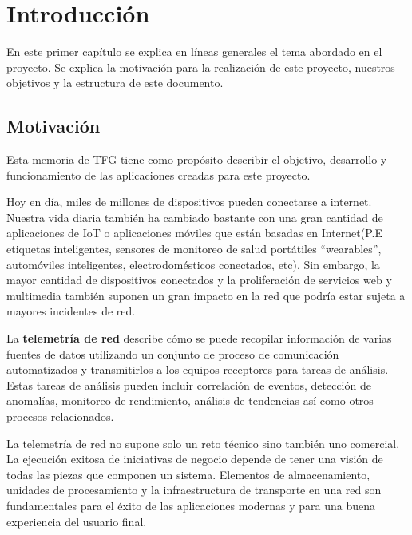 \chapter{Introducción}

    En este primer capítulo se explica en líneas generales el tema abordado en el proyecto. Se explica la motivación para la realización de este proyecto, nuestros objetivos y la estructura de este documento.

\section{Motivación}
    Esta memoria de \gls{TFG} tiene como propósito describir el objetivo, desarrollo y funcionamiento de las aplicaciones creadas para este proyecto.
    
    Hoy en día, miles de millones de dispositivos pueden conectarse a internet. Nuestra vida diaria también ha cambiado bastante con una gran cantidad de aplicaciones de IoT o aplicaciones móviles que están basadas en Internet(P.E etiquetas inteligentes, sensores de monitoreo de salud portátiles \enquote{wearables}, automóviles inteligentes, electrodomésticos conectados, etc). Sin embargo, la mayor cantidad de dispositivos conectados y la proliferación de servicios web y multimedia también suponen un gran impacto en la red que podría estar sujeta a mayores incidentes de red. 
    
    La \textbf{telemetría de red} describe cómo se puede recopilar información de varias fuentes de datos utilizando un conjunto de proceso de comunicación automatizados y transmitirlos a los equipos receptores para tareas de análisis. Estas tareas de análisis pueden incluir correlación de eventos, detección de anomalías, monitoreo de rendimiento, análisis de tendencias así como otros procesos relacionados. 
    
    La telemetría de red no supone solo un reto técnico sino también uno comercial. La ejecución exitosa de iniciativas de negocio depende de tener una visión de todas las piezas que componen un sistema. Elementos de almacenamiento, unidades de procesamiento y la infraestructura de transporte en una red son fundamentales para el éxito de las aplicaciones modernas y para una buena experiencia del usuario final. 
    
